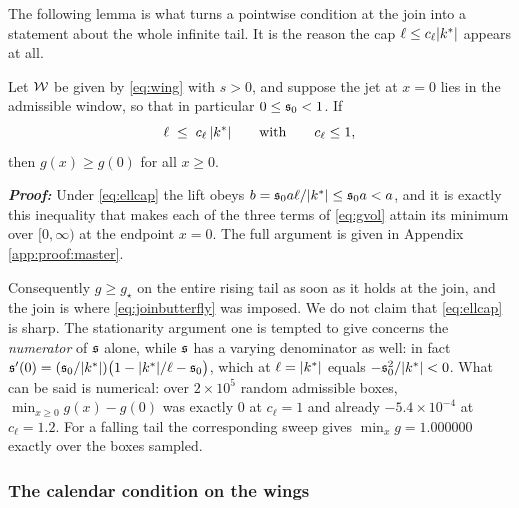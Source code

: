The following lemma is what turns a pointwise condition at the join into a statement about the whole
infinite tail. It is the reason the cap $\ell\le c_{\ell}|k^{*}|$ appears at all.

\begin{lemma}\label{lem:master}
Let $\mathcal{W}$ be given by \eqref{eq:wing} with $s>0$, and suppose the jet at $x=0$ lies in the
admissible window, so that in particular $0\le\mathfrak{s}_{0}<1$. If
\begin{equation}\label{eq:ellcap}
  \ell\;\le\;c_{\ell}\,|k^{*}|
  \qquad\text{with}\qquad c_{\ell}\le1,
\end{equation}
then $g(x)\ge g(0)$ for all $x\ge0$.
\end{lemma}

\textbf{\textit{Proof:}}  Under
\eqref{eq:ellcap} the lift obeys $b=\mathfrak{s}_{0}a\ell/|k^{*}|\le
\mathfrak{s}_{0}a<a$, and it is exactly this inequality that makes each of the three terms of \eqref{eq:gvol} attain its
minimum over $[0,\infty)$ at the endpoint $x=0$. The full argument is given in Appendix \ref{app:proof:master}. \qedfilledtext

Consequently $g\ge g_{\star}$ on the entire rising tail as soon as it holds at the join, and the join
is where \eqref{eq:joinbutterfly} was imposed. We do not claim that \eqref{eq:ellcap} is sharp. The
stationarity argument one is tempted to give concerns the \emph{numerator} of $\mathfrak{s}$ alone, while
$\mathfrak{s}$ has a varying denominator as well: in fact
$\mathfrak{s}'(0)=(\mathfrak{s}_{0}/|k^{*}|)\bigl(1-|k^{*}|/\ell-\mathfrak{s}_{0}\bigr)$, which at
$\ell=|k^{*}|$ equals $-\mathfrak{s}_{0}^{2}/|k^{*}|<0$. What can be said is numerical: over
$2\times10^{5}$ random admissible boxes,
$\min_{x\ge0}g(x)-g(0)$ was exactly $0$ at $c_{\ell}=1$ and already $-5.4\times10^{-4}$ at
$c_{\ell}=1.2$. For a falling tail the corresponding sweep gives $\min_{x}g=1.000000$ exactly over
the boxes sampled.

\vspace{-0.4cm}

\subsubsection{The calendar condition on the wings}
\label{subsec:tailcalendar}

\vspace{-0.4cm}

